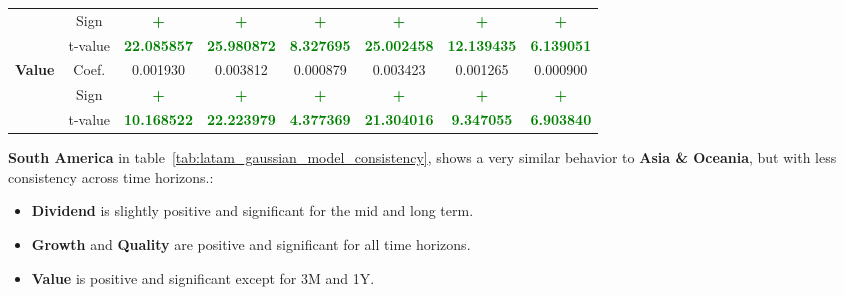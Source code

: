 \documentclass[11pt,english,a4paper,hidelinks]{book}
\begin{document}
\begin{table}[H]
\begin{tabular}{lccccccc}
            & Sign & \textbf{\textcolor{green}{+}} & \textbf{\textcolor{green}{+}} & \textbf{\textcolor{green}{+}} & \textbf{\textcolor{green}{+}} & \textbf{\textcolor{green}{+}} & \textbf{\textcolor{green}{+}} \\
            & t-value & \textbf{\textcolor{green}{22.085857}} & \textbf{\textcolor{green}{25.980872}} & \textbf{\textcolor{green}{8.327695}} & \textbf{\textcolor{green}{25.002458}} & \textbf{\textcolor{green}{12.139435}} & \textbf{\textcolor{green}{6.139051}} \\
        \midrule
        \multirow{3}{*}{\textbf{Value}} 
            & Coef. & 0.001930 & 0.003812 & 0.000879 & 0.003423 & 0.001265 & 0.000900 \\
            & Sign & \textbf{\textcolor{green}{+}} & \textbf{\textcolor{green}{+}} & \textbf{\textcolor{green}{+}} & \textbf{\textcolor{green}{+}} & \textbf{\textcolor{green}{+}} & \textbf{\textcolor{green}{+}} \\
            & t-value & \textbf{\textcolor{green}{10.168522}} & \textbf{\textcolor{green}{22.223979}} & \textbf{\textcolor{green}{4.377369}} & \textbf{\textcolor{green}{21.304016}} & \textbf{\textcolor{green}{9.347055}} & \textbf{\textcolor{green}{6.903840}} \\
        \bottomrule
    \end{tabular}
    \label{tab:asia_gaussian_model_consistency}
\end{table}

\noindent \textbf{South America} in table~\ref{tab:latam_gaussian_model_consistency}, shows a very similar behavior to \textbf{Asia \& Oceania}, but with less consistency across time horizons.:
\begin{itemize}
    \item \textbf{Dividend} is slightly positive and significant for the mid and long term.
    \item \textbf{Growth} and \textbf{Quality} are positive and significant for all time horizons.
    \item \textbf{Value} is positive and significant except for 3M and 1Y.
\end{itemize}
\end{document}

